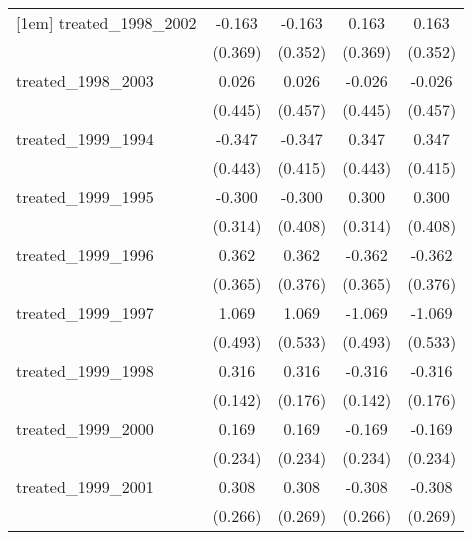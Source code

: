 {\begin{tabular}{l*{4}{c}}
[1em]
treated\_1998\_2002&      -0.163         &      -0.163         &       0.163         &       0.163         \\
            &     (0.369)         &     (0.352)         &     (0.369)         &     (0.352)         \\
[1em]
treated\_1998\_2003&       0.026         &       0.026         &      -0.026         &      -0.026         \\
            &     (0.445)         &     (0.457)         &     (0.445)         &     (0.457)         \\
[1em]
treated\_1999\_1994&      -0.347         &      -0.347         &       0.347         &       0.347         \\
            &     (0.443)         &     (0.415)         &     (0.443)         &     (0.415)         \\
[1em]
treated\_1999\_1995&      -0.300         &      -0.300         &       0.300         &       0.300         \\
            &     (0.314)         &     (0.408)         &     (0.314)         &     (0.408)         \\
[1em]
treated\_1999\_1996&       0.362         &       0.362         &      -0.362         &      -0.362         \\
            &     (0.365)         &     (0.376)         &     (0.365)         &     (0.376)         \\
[1em]
treated\_1999\_1997&       1.069\sym{*}  &       1.069\sym{*}  &      -1.069\sym{*}  &      -1.069\sym{*}  \\
            &     (0.493)         &     (0.533)         &     (0.493)         &     (0.533)         \\
[1em]
treated\_1999\_1998&       0.316\sym{*}  &       0.316         &      -0.316\sym{*}  &      -0.316         \\
            &     (0.142)         &     (0.176)         &     (0.142)         &     (0.176)         \\
[1em]
treated\_1999\_2000&       0.169         &       0.169         &      -0.169         &      -0.169         \\
            &     (0.234)         &     (0.234)         &     (0.234)         &     (0.234)         \\
[1em]
treated\_1999\_2001&       0.308         &       0.308         &      -0.308         &      -0.308         \\
            &     (0.266)         &     (0.269)         &     (0.266)         &     (0.269)         \\

\end{tabular}}
